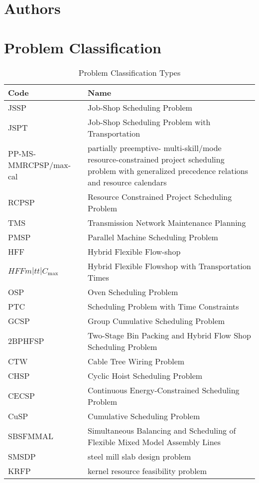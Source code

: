 \documentclass[a4paper]{article}
\begin{document}
\clearpage
\section{Authors}




\clearpage
\section{Problem Classification}


\begin{table}[htbp]
\caption{\label{tab:classification}Problem Classification Types}
\centering
{\scriptsize
\begin{tabular}{lp{8cm}}\toprule
Code & Name \\ \midrule
JSSP & Job-Shop Scheduling Problem \\
JSPT & Job-Shop Scheduling Problem with Transportation \\
PP-MS-MMRCPSP/max-cal & partially preemptive- multi-skill/mode resource-constrained project scheduling problem with generalized precedence relations and resource calendars\\
RCPSP & Resource Constrained Project Scheduling Problem \\
TMS & Transmission Network Maintenance Planning \\
PMSP & Parallel Machine Scheduling Problem\\
HFF & Hybrid Flexible Flow-shop \\
$HFFm|tt|C_{\max}$ & Hybrid Flexible Flowshop with Transportation Times\\
OSP & Oven Scheduling Problem \\
PTC & Scheduling Problem with Time Constraints\\
GCSP & Group Cumulative Scheduling Problem \\
2BPHFSP & Two-Stage Bin Packing and Hybrid Flow Shop Scheduling Problem\\
CTW & Cable Tree Wiring Problem\\
CHSP & Cyclic Hoist Scheduling Problem \\
CECSP & Continuous Energy-Constrained Scheduling Problem \\
CuSP & Cumulative Scheduling Problem \\
SBSFMMAL & Simultaneous Balancing and Scheduling of Flexible Mixed Model Assembly Lines\\
SMSDP & steel mill slab design problem \\
KRFP & kernel resource feasibility problem\\

\end{tabular}}
\end{table}
\end{document}
